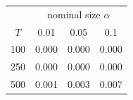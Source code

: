 % 
\begin{tabular}{cccc}
  \hline
  & \multicolumn{3}{c}{nominal size $\alpha$} \\
 $T$ & 0.01 & 0.05 & 0.1 \\
 \hline
100 & 0.000 & 0.000 & 0.000 \\ 
  250 & 0.000 & 0.000 & 0.000 \\ 
  500 & 0.001 & 0.003 & 0.007 \\ 
   \hline
\end{tabular}
